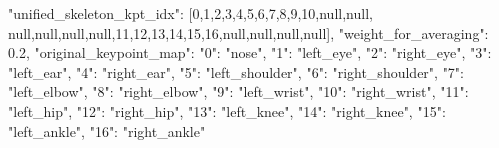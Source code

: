 \startJSON
{
    "unified_skeleton_kpt_idx": [0,1,2,3,4,5,6,7,8,9,10,null,null,
    null,null,null,null,11,12,13,14,15,16,null,null,null,null],
    "weight_for_averaging": 0.2,
    "original_keypoint_map": {
        "0": "nose",
        "1": "left_eye",
        "2": "right_eye",
        "3": "left_ear",
        "4": "right_ear",
        "5": "left_shoulder",
        "6": "right_shoulder",
        "7": "left_elbow",
        "8": "right_elbow",
        "9": "left_wrist",
        "10": "right_wrist",
        "11": "left_hip",
        "12": "right_hip",
        "13": "left_knee",
        "14": "right_knee",
        "15": "left_ankle",
        "16": "right_ankle"
    }
}
\stopJSON
\stopbuffer